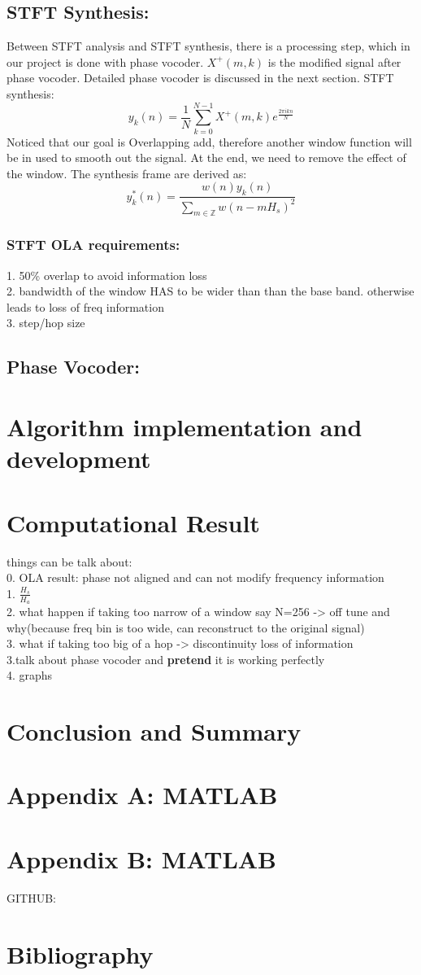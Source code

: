 \documentclass[11pt]{article}
\begin{document}
\subsection{STFT Synthesis:}
Between STFT analysis and STFT synthesis, there is a processing step, which in our project is done with phase vocoder. $X^{+}(m,k)$ is the modified signal after phase vocoder. Detailed phase vocoder is discussed in the next section. 
STFT synthesis: 
\begin{equation}
        y_k(n) = \frac{1}{N}\sum_{k=0}^{N-1} X^{+}(m,k) e^{\frac{2\pi i k n}{N}} 
\end{equation}
Noticed that our goal is Overlapping add, therefore another window function will be in used to smooth out the signal. At the end, we need to remove the effect of the window. The synthesis frame are derived as:
\begin{equation}
        y^{*}_k(n) = \frac{w(n)y_k(n)}{\sum_{m\in \mathbb{Z}}w(n-mH_s)^2}
\end{equation}
\subsubsection*{STFT OLA requirements:}
1. 50\% overlap to avoid information loss\\
2. bandwidth of the window HAS to be wider than than the base band. otherwise leads to loss of freq information\\
3. step/hop size


\subsection{Phase Vocoder: }
\section{Algorithm implementation and development }
\section{Computational Result}
things can be talk about: \\
0. OLA result: phase not aligned and can not modify frequency information\\
1. $\frac{H_s}{H_a}$\\
2. what happen if taking too narrow of a window say N=256 -> off tune and why(because freq bin is too wide, can reconstruct to the original signal)\\
3. what if taking too big of a hop -> discontinuity loss of information\\
3.talk about phase vocoder and \textbf{pretend} it is working perfectly \\
4. graphs 
\section{Conclusion and Summary}
\section{Appendix A: MATLAB  }
\section{Appendix B: MATLAB }
GITHUB: 
\section{Bibliography}
\end{document}
